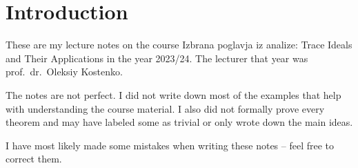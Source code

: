 \section*{Introduction}

These are my lecture notes on the course Izbrana poglavja iz analize:
Trace Ideals and Their Applications in the year 2023/24. The lecturer
that year was prof.~dr.~Oleksiy Kostenko.

The notes are not perfect. I did not write down most of the examples
that help with understanding the course material. I also did not
formally prove every theorem and may have labeled some as trivial or
only wrote down the main ideas.

I have most likely made some mistakes when writing these notes --
feel free to correct them.
